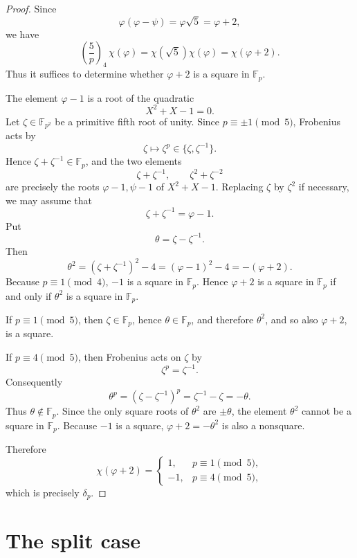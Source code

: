\documentclass[11pt]{amsart}
\theoremstyle{plain}
\theoremstyle{definition}
\newcommand{\qleg}[2]{\left(\frac{#1}{#2}\right)_{\!4}}
\begin{document}
\begin{proof}
Since
\[
  \varphi(\varphi-\psi)=\varphi\sqrt5=\varphi+2,
\]
we have
\[
  \qleg5p\,\chi(\varphi)
  =
  \chi(\sqrt5)\chi(\varphi)
  =
  \chi(\varphi+2).
\]
Thus it suffices to determine whether $\varphi+2$ is a square in $\mathbb F_p$.

The element $\varphi-1$ is a root of the quadratic
\[
  X^2+X-1=0.
\]
Let $\zeta\in\mathbb F_{p^2}$ be a primitive fifth root of unity.
Since $p\equiv\pm1\pmod5$, Frobenius acts by
\[
  \zeta\longmapsto\zeta^p\in\{\zeta,\zeta^{-1}\}.
\]
Hence $\zeta+\zeta^{-1}\in\mathbb F_p$, and the two elements
\[
  \zeta+\zeta^{-1},
  \qquad
  \zeta^2+\zeta^{-2}
\]
are precisely the roots $\varphi-1,\psi-1$ of $X^2+X-1$.
Replacing $\zeta$ by $\zeta^2$ if necessary, we may assume that
\[
  \zeta+\zeta^{-1}=\varphi-1.
\]
Put
\[
  \theta=\zeta-\zeta^{-1}.
\]
Then
\[
  \theta^2
  =
  (\zeta+\zeta^{-1})^2-4
  =
  (\varphi-1)^2-4
  =
  -(\varphi+2).
\]
Because $p\equiv1\pmod4$, $-1$ is a square in $\mathbb F_p$. Hence
$\varphi+2$ is a square in $\mathbb F_p$ if and only if $\theta^2$ is a square
in $\mathbb F_p$.

If $p\equiv1\pmod5$, then $\zeta\in\mathbb F_p$, hence
$\theta\in\mathbb F_p$, and therefore $\theta^2$, and so also $\varphi+2$,
is a square.

If $p\equiv4\pmod5$, then Frobenius acts on $\zeta$ by
\[
  \zeta^p=\zeta^{-1}.
\]
Consequently
\[
  \theta^p=(\zeta-\zeta^{-1})^p=\zeta^{-1}-\zeta=-\theta.
\]
Thus $\theta\notin\mathbb F_p$. Since the only square roots of $\theta^2$ are
$\pm\theta$, the element $\theta^2$ cannot be a square in $\mathbb F_p$.
Because $-1$ is a square, $\varphi+2=-\theta^2$ is also a nonsquare.

Therefore
\[
  \chi(\varphi+2)=
  \begin{cases}
    1,&p\equiv1\pmod5,\\
    -1,&p\equiv4\pmod5,
  \end{cases}
\]
which is precisely $\delta_p$.
\end{proof}

\section{The split case}\label{sec:split}
\end{document}
